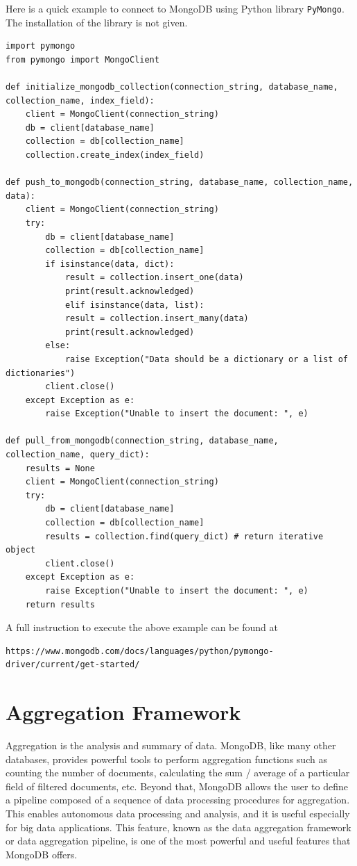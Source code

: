 Here is a quick example to connect to MongoDB using Python library \verb|PyMongo|. The installation of the library is not given.
\begin{lstlisting}
import pymongo
from pymongo import MongoClient

def initialize_mongodb_collection(connection_string, database_name, collection_name, index_field):
	client = MongoClient(connection_string)
	db = client[database_name]
	collection = db[collection_name]
	collection.create_index(index_field)

def push_to_mongodb(connection_string, database_name, collection_name, data):
	client = MongoClient(connection_string)
	try:
		db = client[database_name]
		collection = db[collection_name]
		if isinstance(data, dict):
			result = collection.insert_one(data)
			print(result.acknowledged)
			elif isinstance(data, list):
			result = collection.insert_many(data)
			print(result.acknowledged)
		else:
			raise Exception("Data should be a dictionary or a list of dictionaries")
		client.close()
	except Exception as e:
		raise Exception("Unable to insert the document: ", e)

def pull_from_mongodb(connection_string, database_name, collection_name, query_dict):
	results = None
	client = MongoClient(connection_string)
	try:
		db = client[database_name]
		collection = db[collection_name]
		results = collection.find(query_dict) # return iterative object
		client.close()
	except Exception as e:
		raise Exception("Unable to insert the document: ", e)
	return results

\end{lstlisting}
A full instruction to execute the above example can be found at
\begin{lstlisting}
https://www.mongodb.com/docs/languages/python/pymongo-driver/current/get-started/
\end{lstlisting}

\section{Aggregation Framework}

Aggregation is the analysis and summary of data. MongoDB, like many other databases, provides powerful tools to perform aggregation functions such as counting the number of documents, calculating the sum / average of a particular field of filtered documents, etc. Beyond that, MongoDB allows the user to define a pipeline composed of a sequence of data processing procedures for aggregation. This enables autonomous data processing and analysis, and it is useful especially for big data applications. This feature, known as the data aggregation framework or data aggregation pipeline, is one of the most powerful and useful features that MongoDB offers.

